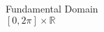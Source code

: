 \documentclass[preview]{standalone}
\begin{document}
\begin{center}
Fundamental Domain\\$[0, 2\pi] \times \mathbb{R}$
\end{center}
\end{document}
